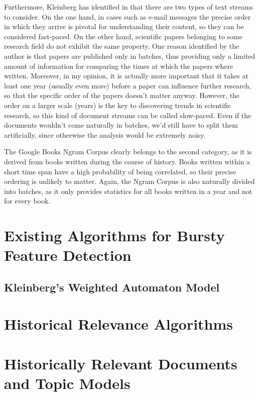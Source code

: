 Furthermore, Kleinberg has identified in \cite{Kleinberg:2002:BHS:775047.775061} that there are two types of text streams to consider. On the one hand, in cases such as e-mail messages the precise order in which they arrive is pivotal for understanding their content, so they can be considered fast-paced. On the other hand, scientific papers belonging to some research field do not exhibit the same property. One reason identified by the author is that papers are published only in batches, thus providing only a limited amount of information for comparing the times at which the papers where written. Moreover, in my opinion, it is actually more important that it takes at least one year (usually even more) before a paper can influence further research, so that the specific order of the papers doesn't matter anyway. However, the order on a larger scale (years) is the key to discovering trends in scientific research, so this kind of document streams can be called slow-paced. Even if the documents wouldn't come naturally in batches, we'd still have to split them artificially, since otherwise the analysis would be extremely noisy.

The Google Books Ngram Corpus clearly belongs to the second category, as it is derived from books written during the course of history. Books written within a short time span have a high probability of being correlated, so their precise ordering is unlikely to matter. Again, the Ngram Corpus is also naturally divided into batches, as it only provides statistics for all books written in a year and not for every book.

\section{Existing Algorithms for Bursty Feature Detection}
\label{sec:bf-existing-algorithms}

\subsection{Kleinberg's Weighted Automaton Model}
\label{subsec:bf-kleinberg}

\section{Historical Relevance Algorithms}
\label{sec:historical-relevance-algorithms}


\section{Historically Relevant Documents and Topic Models}
\label{sec:hist-relevant-doc}

